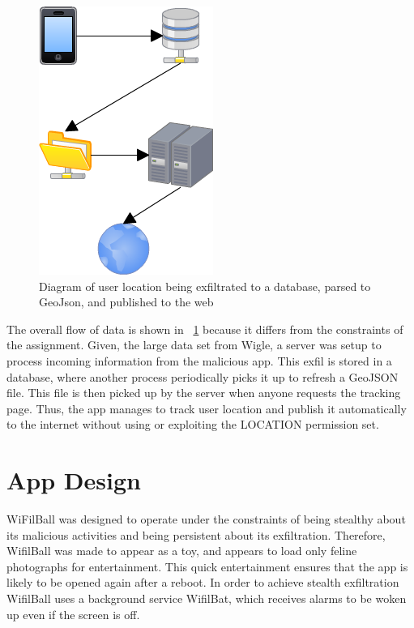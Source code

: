 \documentclass[conference,compsoc]{IEEEtran}
\begin{document}
\begin{figure}
\includegraphics[width=0.5\columnwidth]{attackflow.png}
\caption{Diagram of user location being exfiltrated to a database, parsed to GeoJson, and published to the web\cite{Tracking}}
\label{FlowDiagram}
\end{figure}

The overall flow of data is shown in ~\ref{FlowDiagram} because it differs from the constraints of the assignment. Given, the large data set from Wigle, a server was setup to process incoming information from the malicious app. This exfil is stored in a database, where another process periodically picks it up to refresh a GeoJSON\cite{geojson} file. This file is then picked up by the server when anyone requests the tracking page. Thus, the app manages to track user location and publish it automatically to the internet\cite{Tracking} without using or exploiting the LOCATION permission set.

\section{App Design}
WiFilBall was designed to operate under the constraints of being stealthy about its malicious activities and being persistent about its exfiltration. Therefore, WifilBall was made to appear as a toy, and appears to load only feline photographs for entertainment. This quick entertainment ensures that the app is likely to be opened again after a reboot. In order to achieve stealth exfiltration WifilBall uses a background service WifilBat, which receives alarms to be woken up even if the screen is off.
\end{document}
